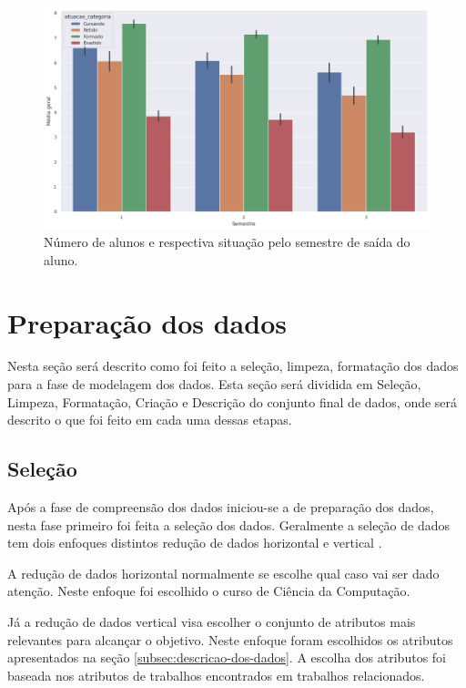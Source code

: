 \documentclass[diss,capa]{texufpel}
\begin{document}
\begin{figure}[htbp]
\centering \includegraphics[scale=.45]{imagens/media-geral-por-semestre.png}
\caption{Número de alunos e respectiva situação pelo semestre de saída do aluno.}
\label{fig:media-geral-por-semestre}
\end{figure}

\section{Preparação dos dados}
\label{sec:preparacao-dados}

Nesta seção será descrito como foi feito a seleção, limpeza, formatação dos dados para a fase de modelagem dos dados. Esta seção será dividida em Seleção, Limpeza, Formatação, Criação e Descrição do conjunto final de dados, onde será descrito o que foi feito em cada uma dessas etapas.



\subsection{Seleção}

Após a fase de compreensão dos dados iniciou-se a de preparação dos dados, nesta fase primeiro foi feita a seleção dos dados. Geralmente a seleção de dados tem dois enfoques distintos redução de dados horizontal e vertical \cite{goldschmidt2015data}.

A redução de dados horizontal normalmente se escolhe qual caso vai ser dado atenção.
Neste enfoque foi escolhido o curso de Ciência da Computação.

Já a redução de dados vertical visa escolher o conjunto de atributos mais relevantes para alcançar o objetivo.
Neste enfoque foram escolhidos os atributos apresentados na seção \ref{subsec:descricao-dos-dados}.
A escolha dos atributos foi baseada nos atributos de trabalhos encontrados em trabalhos relacionados.
\end{document}
